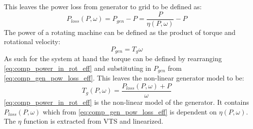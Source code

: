 This leaves the power loss from generator to grid to be defined as:
\begin{equation} \label{eq:comp_gen_pow_loss_eff}
	P_{loss}(P, \omega) = P_{gen} - P = \dfrac{P}{\eta(P, \omega)} - P
\end{equation}
The power of a rotating machine can be defined as the product of torque and rotational velocity:
\begin{equation}\label{eq:comp_power_in_rot_eff}
	P_{gen} = T_g \omega
\end{equation}
As such for the system at hand the torque can be defined by rearranging \cref{eq:comp_power_in_rot_eff} and substituting in $ P_{gen} $ from \cref{eq:comp_gen_pow_loss_eff}. This leaves the non-linear generator model to be:
\begin{equation}\label{eq:comp_gen_torque_eff}
	T_g(P, \omega) = \dfrac{P_{loss}(P, \omega) + P}{\omega}
\end{equation}
\cref{eq:comp_power_in_rot_eff} is the non-linear model of the generator. It contains $ P_{loss}(P,\omega) $ which from \cref{eq:comp_gen_pow_loss_eff} is dependent on $ \eta(P, \omega) $. The $ \eta $ function is extracted from VTS and linearized.

